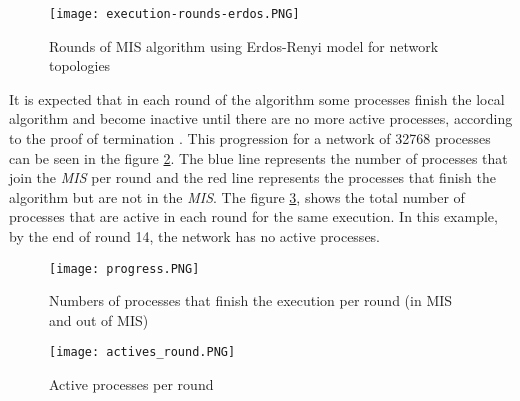\begin{figure}[ht]
\centering
\texttt{[image: execution-rounds-erdos.PNG]} 
\caption{Rounds of MIS algorithm using Erdos-Renyi model for network topologies}
\label{fig:rounds-erdos}
\end{figure}


It is expected that in each round of the algorithm some processes finish the local algorithm and become inactive until there are no more active processes, according to the proof of termination \cite{yves2009optimal}. This progression for a network of 32768 processes can be seen in the figure \ref{fig:progression}. The blue line represents the number of processes that join the \textit{MIS}  per round and the red line represents the processes that finish the algorithm but are not in the \textit{MIS}. The figure \ref{fig:actives}, shows the total number of processes that are active in each round for the same execution. In this example, by the end of round 14, the network has no active processes.  

\begin{figure}[ht]
\centering
\texttt{[image: progress.PNG]} 
\caption{Numbers of processes that finish the execution per round (in MIS and out of MIS)}
\label{fig:progression}
\end{figure}

\begin{figure}[bt]
\centering
\texttt{[image: actives\_round.PNG]} 
\caption{Active processes per round}
\label{fig:actives}
\end{figure}

